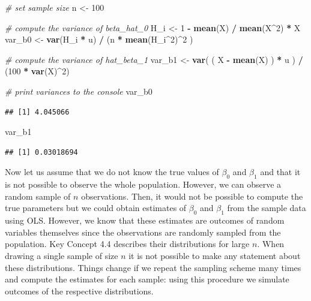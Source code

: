 \documentclass[]{book}
\newenvironment{Shaded}{\begin{snugshade}}{\end{snugshade}}
\newcommand{\KeywordTok}[1]{\textcolor[rgb]{0.13,0.29,0.53}{\textbf{#1}}}
\newcommand{\DecValTok}[1]{\textcolor[rgb]{0.00,0.00,0.81}{#1}}
\newcommand{\StringTok}[1]{\textcolor[rgb]{0.31,0.60,0.02}{#1}}
\newcommand{\CommentTok}[1]{\textcolor[rgb]{0.56,0.35,0.01}{\textit{#1}}}
\newcommand{\OperatorTok}[1]{\textcolor[rgb]{0.81,0.36,0.00}{\textbf{#1}}}
\newcommand{\NormalTok}[1]{#1}
\theoremstyle{definition}
\theoremstyle{definition}
\theoremstyle{definition}
\theoremstyle{remark}
\begin{document}
\begin{Shaded}
\begin{Highlighting}[]
\CommentTok{# set sample size}
\NormalTok{n <-}\StringTok{ }\DecValTok{100}

\CommentTok{# compute the variance of beta_hat_0}
\NormalTok{H_i <-}\StringTok{ }\DecValTok{1} \OperatorTok{-}\StringTok{ }\KeywordTok{mean}\NormalTok{(X) }\OperatorTok{/}\StringTok{ }\KeywordTok{mean}\NormalTok{(X}\OperatorTok{^}\DecValTok{2}\NormalTok{) }\OperatorTok{*}\StringTok{ }\NormalTok{X}
\NormalTok{var_b0 <-}\StringTok{ }\KeywordTok{var}\NormalTok{(H_i }\OperatorTok{*}\StringTok{ }\NormalTok{u) }\OperatorTok{/}\StringTok{ }\NormalTok{(n }\OperatorTok{*}\StringTok{ }\KeywordTok{mean}\NormalTok{(H_i}\OperatorTok{^}\DecValTok{2}\NormalTok{)}\OperatorTok{^}\DecValTok{2}\NormalTok{ )}

\CommentTok{# compute the variance of hat_beta_1}
\NormalTok{var_b1 <-}\StringTok{ }\KeywordTok{var}\NormalTok{( ( X }\OperatorTok{-}\StringTok{ }\KeywordTok{mean}\NormalTok{(X) ) }\OperatorTok{*}\StringTok{ }\NormalTok{u ) }\OperatorTok{/}\StringTok{ }\NormalTok{(}\DecValTok{100} \OperatorTok{*}\StringTok{ }\KeywordTok{var}\NormalTok{(X)}\OperatorTok{^}\DecValTok{2}\NormalTok{)}
\end{Highlighting}
\end{Shaded}

\begin{Shaded}
\begin{Highlighting}[]
\CommentTok{# print variances to the console}
\NormalTok{var_b0}
\end{Highlighting}
\end{Shaded}

\begin{verbatim}
## [1] 4.045066
\end{verbatim}

\begin{Shaded}
\begin{Highlighting}[]
\NormalTok{var_b1}
\end{Highlighting}
\end{Shaded}

\begin{verbatim}
## [1] 0.03018694
\end{verbatim}

Now let us assume that we do not know the true values of \(\beta_0\) and
\(\beta_1\) and that it is not possible to observe the whole population.
However, we can observe a random sample of \(n\) observations. Then, it
would not be possible to compute the true parameters but we could obtain
estimates of \(\beta_0\) and \(\beta_1\) from the sample data using OLS.
However, we know that these estimates are outcomes of random variables
themselves since the observations are randomly sampled from the
population. Key Concept 4.4 describes their distributions for large
\(n\). When drawing a single sample of size \(n\) it is not possible to
make any statement about these distributions. Things change if we repeat
the sampling scheme many times and compute the estimates for each
sample: using this procedure we simulate outcomes of the respective
distributions.
\end{document}
